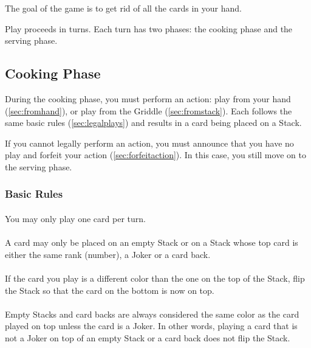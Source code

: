 \documentclass{article}
\begin{document}
The goal of the game is to get rid of all the cards in your hand.

Play proceeds in turns. Each turn has two phases: the cooking phase and the serving phase.

\subsection{Cooking Phase \label{sec:cookingphase}}

During the cooking phase, you must perform an action: play from your hand (\autoref{sec:fromhand}), or play from the Griddle (\autoref{sec:fromstack}). Each follows the same basic rules (\autoref{sec:legalplays}) and results in a card being placed on a Stack.

If you cannot legally perform an action, you must announce that you have no play and forfeit your action (\autoref{sec:forfeitaction}). In this case, you still move on to the serving phase.

\subsubsection{Basic Rules \label{sec:legalplays}}

\paragraph{\label{par:onecard}}
You may only play one card per turn.

\paragraph{\label{par:basicplay}}
A card may only be placed on an empty Stack or on a Stack whose top card is either the same rank (number), a Joker or a card back.

\paragraph{\label{par:flip}}
If the card you play is a different color than the one on the top of the Stack, flip the Stack so that the card on the bottom is now on top.

\paragraph{\label{par:empty}}
Empty Stacks and card backs are always considered the same color as the card played on top unless the card is a Joker.
In other words, playing a card that is not a Joker on top of an empty Stack or a card back does not flip the Stack.
\end{document}

